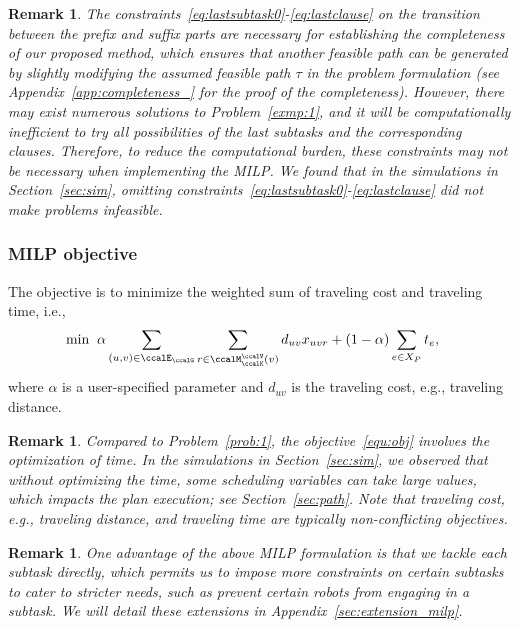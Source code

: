 \documentclass[Afour,sageh,times]{sagej}
\newtheorem{rem}[thm]{Remark}
\begin{document}
{{{{{\begin{rem}
  The constraints~\eqref{eq:lastsubtask0}-\eqref{eq:lastclause} on the transition between the prefix and suffix parts are necessary for establishing the completeness of our proposed method, which ensures that another feasible path can be generated by slightly modifying the assumed feasible path $\tau$ in the problem formulation (see Appendix~\ref{app:completeness_} for the proof of the completeness). However, there may exist numerous solutions to Problem~\ref{exmp:1}, and it will be computationally inefficient to try all possibilities of the last subtasks and the corresponding clauses.  Therefore, to reduce the computational burden, these constraints may not be necessary when implementing the MILP.  We found that in the simulations in Section~\ref{sec:sim}, omitting constraints~\eqref{eq:lastsubtask0}-\eqref{eq:lastclause}  did not make problems infeasible.
\end{rem}


\subsubsection{MILP objective} The objective is to minimize the weighted sum of traveling cost and traveling time, i.e.,
\begin{align}\label{equ:obj}
  \min \; \;&  \alpha \sum_{(u,v)\in \ccalE_\ccalG}  \sum_{r \in \ccalM^\ccalV_{\ccalK}(v)} d_{uv} x_{uvr} +  (1 - \alpha) \sum_{e\in X_P} t_e,
\end{align}
  where $\alpha$ is a user-specified parameter and  $d_{uv}$ is the traveling cost, e.g., traveling distance.
  \begin{rem}
   Compared to Problem~\ref{prob:1}, the objective~\eqref{equ:obj} involves the optimization of time. In the simulations in Section~\ref{sec:sim}, we observed that without optimizing the time, some scheduling variables can take large values, which impacts the plan execution; see Section~\ref{sec:path}. Note that traveling cost, e.g., traveling distance, and traveling time are typically non-conflicting objectives.
  \end{rem}
  \begin{rem}
    One advantage of the above MILP formulation is that we tackle each subtask directly,  which permits us to impose more constraints on certain subtasks to cater to stricter needs, such as prevent certain robots from engaging in a subtask. We will detail these extensions in Appendix~\ref{sec:extension_milp}.
  \end{rem}
                }}

}}}
\end{document}
